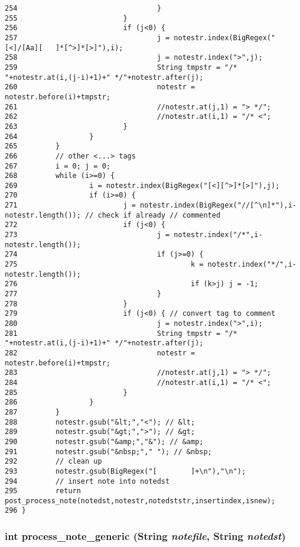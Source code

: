 \begin{verbatim}
254                                 }
255                         }
256                         if (j<0) {
257                                 j = notestr.index(BigRegex("[<]/[Aa][   ]*[^>]*[>]"),i);
258                                 j = notestr.index(">",j);
259                                 String tmpstr = "/* "+notestr.at(i,(j-i)+1)+" */"+notestr.after(j);
260                                 notestr = notestr.before(i)+tmpstr;
261                                 //notestr.at(j,1) = "> */";
262                                 //notestr.at(i,1) = "/* <";
263                         }
264                 }
265         }
266         // other <...> tags
267         i = 0; j = 0;
268         while (i>=0) {
269                 i = notestr.index(BigRegex("[<][^>]*[>]"),j);
270                 if (i>=0) {
271                         j = notestr.index(BigRegex("//[^\n]*"),i-notestr.length()); // check if already // commented
272                         if (j<0) {
273                                 j = notestr.index("/*",i-notestr.length());
274                                 if (j>=0) {
275                                         k = notestr.index("*/",i-notestr.length());
276                                         if (k>j) j = -1;
277                                 }
278                         }
279                         if (j<0) { // convert tag to comment
280                                 j = notestr.index(">",i);
281                                 String tmpstr = "/* "+notestr.at(i,(j-i)+1)+" */"+notestr.after(j);
282                                 notestr = notestr.before(i)+tmpstr;
283                                 //notestr.at(j,1) = "> */";
284                                 //notestr.at(i,1) = "/* <";
285                         }
286                 }
287         }
288         notestr.gsub("&lt;","<"); // &lt;
289         notestr.gsub("&gt;",">"); // &gt;
290         notestr.gsub("&amp;","&"); // &amp;
291         notestr.gsub("&nbsp;"," "); // &nbsp;
292         // clean up
293         notestr.gsub(BigRegex("[        ]+\n"),"\n");
294         // insert note into notedst
295         return post_process_note(notedst,notestr,notedststr,insertindex,isnew);
296 }
\end{verbatim}\normalsize 
{}
\subsubsection{\setlength{\rightskip}{0pt plus 5cm}int process\_\-note\_\-generic ({\bf String} {\em notefile}, {\bf String} {\em notedst})}\label{dil2al_8hh_a336}




